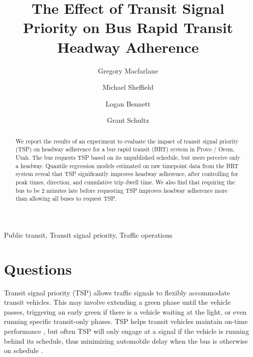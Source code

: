 \documentclass[3p, authoryear, review]{elsarticle} %
\begin{document}
\begin{frontmatter}

  \title{The Effect of Transit Signal Priority on Bus Rapid Transit Headway Adherence}
    \author[BYU]{Gregory Macfarlane}
    \author[WCG]{Michael Sheffield}
    \author[BYU]{Logan Bennett}
    \author[BYU]{Grant Schultz}
      \address[BYU]{Brigham Young University, Civil and Environmental Engineering Department, 430 Engineering Building, Provo, Utah 84602}
    \address[WCG]{Wall Consultant Group, 9980 S 300 W Ste 200 Sandy, UT 84070}
  
  \begin{abstract}
  We report the results of an experiment to evaluate the impact of transit signal priority (TSP) on headway adherence for a bus rapid transit (BRT) system in Provo / Orem, Utah. The bus requests TSP based on its unpublished schedule, but users perceive only a headway. Quantile regression models estimated on raw timepoint data from the BRT system reveal that TSP significantly improves headway adherence, after controlling for peak times, direction, and cumulative trip dwell time. We also find that requiring the bus to be 2 minutes late before requesting TSP improves headway adherence more than allowing all buses to request TSP.
  \end{abstract}
   \begin{keyword} Public transit, Transit signal priority, Traffic operations\end{keyword}
 \end{frontmatter}

\hypertarget{intro}{%
\section{Questions}\label{intro}}

Transit signal priority (TSP) allows traffic signals to flexibly accommodate
transit vehicles. This may involve extending a green phase until the vehicle
passes, triggering an early green if there is a vehicle waiting at the light, or
even running specific transit-only phases. TSP helps transit vehicles maintain
on-time performance \citep{sheffieldsensitivity, Liu2018}, but often TSP will only engage at a signal if
the vehicle is running behind its schedule, thus minimizing automobile delay
when the bus is otherwise on schedule \citep{NI20201}.
\end{document}
